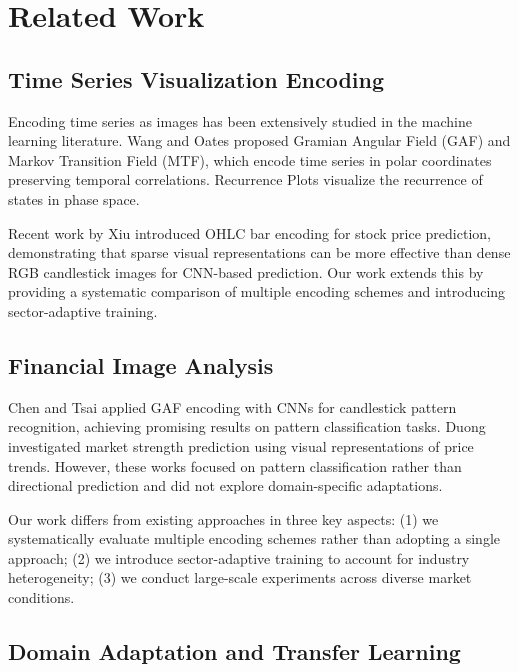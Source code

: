 \documentclass[runningheads]{llncs}
\begin{document}
\section{Related Work}
\label{sec:related}

\subsection{Time Series Visualization Encoding}
\label{sec:encoding}

Encoding time series as images has been extensively studied in the machine learning literature. Wang and Oates \cite{Wang15} proposed Gramian Angular Field (GAF) and Markov Transition Field (MTF), which encode time series in polar coordinates preserving temporal correlations. Recurrence Plots \cite{Eckmann87} visualize the recurrence of states in phase space. 

Recent work by Xiu \etal \cite{Xiu21} introduced OHLC bar encoding for stock price prediction, demonstrating that sparse visual representations can be more effective than dense RGB candlestick images for CNN-based prediction. Our work extends this by providing a systematic comparison of multiple encoding schemes and introducing sector-adaptive training.

\subsection{Financial Image Analysis}
\label{sec:financial}

Chen and Tsai \cite{Chen20} applied GAF encoding with CNNs for candlestick pattern recognition, achieving promising results on pattern classification tasks. Duong \etal \cite{Duong25} investigated market strength prediction using visual representations of price trends. However, these works focused on pattern classification rather than directional prediction and did not explore domain-specific adaptations.

Our work differs from existing approaches in three key aspects: (1) we systematically evaluate multiple encoding schemes rather than adopting a single approach; (2) we introduce sector-adaptive training to account for industry heterogeneity; (3) we conduct large-scale experiments across diverse market conditions.

\subsection{Domain Adaptation and Transfer Learning}
\label{sec:domain}
\end{document}
